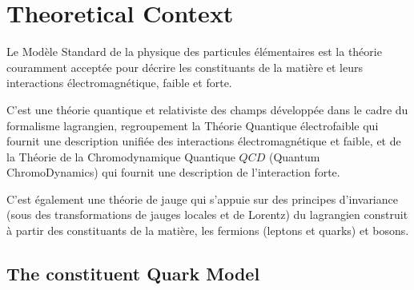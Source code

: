 \section{Theoretical Context}
\label{p1}

Le Mod\`ele Standard de la physique des particules \'el\'ementaires est la th\'eorie couramment accept\'ee pour d\'ecrire les constituants de la mati\`ere et leurs interactions \'electromagn\'etique, faible et forte.
~\par C'est une th\'eorie quantique et relativiste des champs d\'evelopp\'ee dans le cadre du formalisme lagrangien, regroupement la Th\'eorie Quantique \'electrofaible qui fournit une description unifi\'ee des interactions \'electromagn\'etique et faible, et de la Th\'eorie de la Chromodynamique Quantique $QCD$ (Quantum ChromoDynamics) qui fournit une description de l'interaction forte. 
~\par C'est \'egalement une th\'eorie de jauge qui s'appuie sur des principes d'invariance (sous des transformations de jauges locales et de Lorentz) du lagrangien construit \`a partir des constituants de la mati\`ere, les fermions (leptons et quarks) et bosons.

\subsection{The constituent Quark Model}

